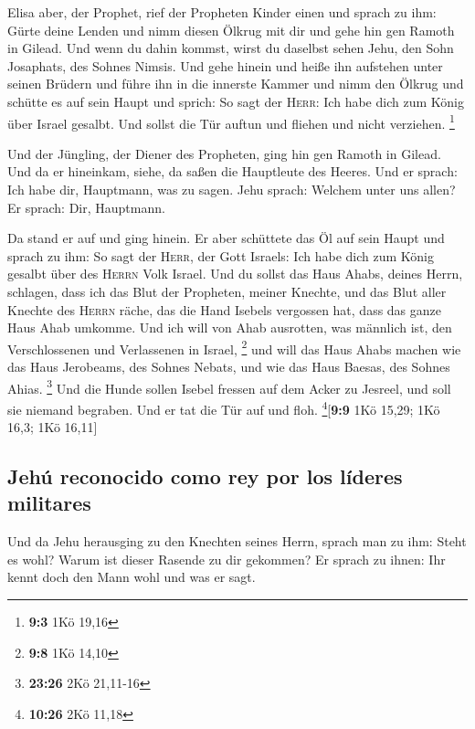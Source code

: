  Elisa aber, der Prophet, rief der Propheten Kinder einen
und sprach zu ihm: Gürte deine Lenden und nimm diesen Ölkrug mit dir und
gehe hin gen Ramoth in Gilead.  Und wenn du dahin kommst,
wirst du daselbst sehen Jehu, den Sohn Josaphats, des Sohnes Nimsis. Und
gehe hinein und heiße ihn aufstehen unter seinen Brüdern und führe ihn
in die innerste Kammer  und nimm den Ölkrug und schütte es
auf sein Haupt und sprich: So sagt der \textsc{Herr}: Ich habe dich zum
König über Israel gesalbt. Und sollst die Tür auftun und fliehen und
nicht verziehen. \footnote{\textbf{9:3} 1Kö 19,16}

 Und der Jüngling, der Diener des Propheten, ging hin gen
Ramoth in Gilead.  Und da er hineinkam, siehe, da saßen
die Hauptleute des Heeres. Und er sprach: Ich habe dir, Hauptmann, was
zu sagen. Jehu sprach: Welchem unter uns allen? Er sprach: Dir,
Hauptmann.

 Da stand er auf und ging hinein. Er aber schüttete das Öl
auf sein Haupt und sprach zu ihm: So sagt der \textsc{Herr}, der Gott
Israels: Ich habe dich zum König gesalbt über des \textsc{Herrn} Volk
Israel.  Und du sollst das Haus Ahabs, deines Herrn,
schlagen, dass ich das Blut der Propheten, meiner Knechte, und das Blut
aller Knechte des \textsc{Herrn} räche, das die Hand Isebels vergossen
hat,  dass das ganze Haus Ahab umkomme. Und ich will von
Ahab ausrotten, was männlich ist, den Verschlossenen und Verlassenen in
Israel, \footnote{\textbf{9:8} 1Kö 14,10}  und will das
Haus Ahabs machen wie das Haus Jerobeams, des Sohnes Nebats, und wie das
Haus Baesas, des Sohnes Ahias. \footnote{\textbf{23:26} 2Kö 21,11-16}
 Und die Hunde sollen Isebel fressen auf dem Acker zu
Jesreel, und soll sie niemand begraben. Und er tat die Tür auf und floh.
\footnote{\textbf{10:26} 2Kö 11,18}{[}\textbf{9:9} 1Kö 15,29; 1Kö 16,3;
1Kö 16,11{]}

\hypertarget{jehuxfa-reconocido-como-rey-por-los-luxedderes-militares}{%
\subsection{Jehú reconocido como rey por los líderes
militares}\label{jehuxfa-reconocido-como-rey-por-los-luxedderes-militares}}

 Und da Jehu herausging zu den Knechten seines Herrn,
sprach man zu ihm: Steht es wohl? Warum ist dieser Rasende zu dir
gekommen? Er sprach zu ihnen: Ihr kennt doch den Mann wohl und was er
sagt.

